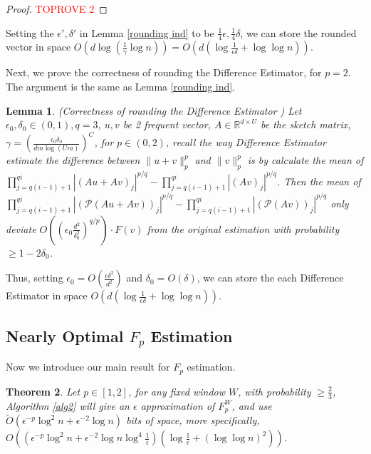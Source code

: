 \documentclass{article}
\newcommand{\dif}{\textsf{Difference Estimator }}
\newcommand{\diff}{\textsf{Difference Estimator}}
\theoremstyle{plain}
\newtheorem{theorem}{Theorem}[section]
\newtheorem{lem}[theorem]{Lemma}
\begin{document}
\begin{proof}\textcolor{red}{TOPROVE 2}\end{proof}

Setting the $\epsilon', \delta'$ in Lemma \ref{rounding ind} to be $\frac 14 \epsilon, \frac 14 \delta$, we can store the rounded vector in space $O(d \log (\frac 1\gamma \log n)) = O(d (\log \frac{1}{\epsilon \delta} + \log\log n))$. 

Next, we prove the correctness of rounding the \diff, for $p = 2$. The argument is the same as Lemma \ref{rounding ind}. 

\begin{lem}(Correctness of rounding the \dif) \label{rounding dif}
 Let $\epsilon_0, \delta_0 \in (0, 1), q = 3$, $u, v$ be 2 frequent vector, $A \in \mathbb{R} ^ {d\times U}$ be the sketch matrix, $\gamma = (\frac{\epsilon_0  \delta_0}{dm \log (Um)}) ^ C$, for $p \in (0, 2)$, recall the way \dif estimate the difference between $\|u+v\|_p ^ p$ and $\|v\|_p ^ p$ is by calculate the mean of $\prod_{j=  q(i-1) + 1} ^ {qi} |(Au+Av)_j| ^ {p/q} - \prod_{j=  q(i-1) + 1} ^ {qi} |(Av)_j| ^ {p/q}$.  Then the mean of $\prod_{j=  q(i-1) + 1} ^ {qi} |(\mathcal{P}(Au+Av))_j| ^ {p/q} - \prod_{j=  q(i-1) + 1} ^ {qi} |(\mathcal{P}(Av))_j| ^ {p/q}$ only deviate $O((\epsilon_0 \frac{d ^ 2}{\delta_0 ^ 2}) ^ {q/p})\cdot F(v)$ from the original estimation with probability $\ge 1 - 2\delta_0$. 
    
\end{lem}

Thus, setting $\epsilon_0 = O(\frac{\epsilon \delta ^ 2}{d ^ 2})$ and $\delta_0 = O(\delta)$, we can store the each \dif in space $O(d (\log \frac {1}{\epsilon\delta} + \log\log n))$.  \subsection{Nearly Optimal $F_p$ Estimation}

 
Now we introduce our main result for $F_p$ estimation.

\begin{theorem}\label{main est}
    Let $p\in [1, 2]$, for any fixed window $W$, with probability $\ge \frac 23$, Algorithm \ref{alg2} will give an $\epsilon$ approximation of $F_p ^ {W}$, and  use $\tilde{O}(\epsilon ^ {-p}\log ^ 2n + \epsilon ^ {-2} \log n)$ bits of space, more specifically, $O((\epsilon ^ {-p} \log ^ 2n + \epsilon ^ {-2}\log n \log ^ 4 \frac 1{\epsilon}) (\log \frac{1}{\epsilon} + (\log \log n) ^ 2))$.
\end{theorem}
\end{document}
